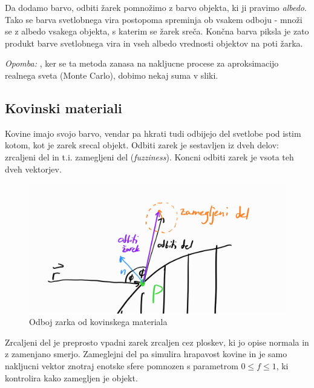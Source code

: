 \documentclass[12pt, a4paper]{article}
\begin{document}
Da dodamo barvo, odbiti žarek pomnožimo z barvo objekta, ki ji pravimo \textit{albedo}. Tako se barva
svetlobnega vira postopoma spreminja ob vsakem odboju - množi se z albedo vsakega objekta, s katerim se
žarek sreča. Končna barva piksla je zato produkt barve svetlobnega vira in vseh albedo vrednosti
objektov na poti žarka.

\textit{Opomba: }, ker se ta metoda zanasa na nakljucne procese za aproksimacijo realnega sveta (Monte Carlo),
dobimo nekaj suma v sliki.

\subsection{Kovinski materiali}

Kovine imajo svojo barvo, vendar pa hkrati tudi odbijejo del svetlobe pod istim kotom, kot je
zarek srecal objekt. Odbiti zarek je sestavljen iz dveh delov: zrcaljeni del in t.i. zamegljeni del
(\textit{fuzziness}). Koncni odbiti zarek je vsota teh dveh vektorjev.

\begin{figure}[h]
	\centering
	\includegraphics[width=400pt]{metal}
	\caption{Odboj zarka od kovinskega materiala}
\end{figure}

Zrcaljeni del je preprosto vpadni zarek zrcaljen cez ploskev, ki jo opise normala in z zamenjano smerjo.
Zameglejni del pa simulira hrapavost kovine in je samo nakljucni vektor znotraj enotske sfere pomnozen
s parametrom $0 \leq f \leq 1$, ki kontrolira kako zamegljen je objekt.

\printbibliography
\end{document}
